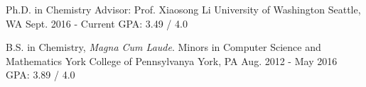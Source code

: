 

\begin{cventries}

  \cventry
    {Ph.D. in Chemistry\newline
    Advisor: Prof. Xiaosong Li}%
    {University of Washington} %
    {Seattle, WA} %
    {Sept. 2016 - Current} %
    {GPA: 3.49 / 4.0} %



  \cventry
    {B.S. in Chemistry, \emph{Magna Cum Laude}. Minors in Computer Science and Mathematics} %
    {York College of Pennsylvanya} %
    {York, PA} %
    {Aug. 2012 - May 2016} %
    {GPA: 3.89 / 4.0} %

\end{cventries}
